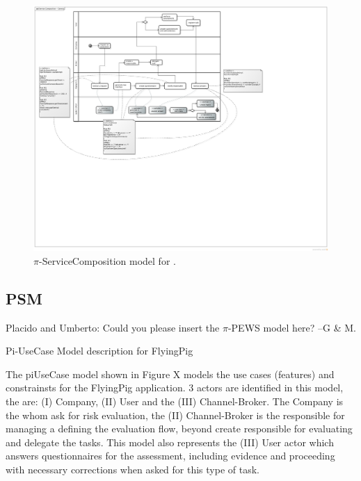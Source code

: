 \begin{figure}
\centering
\includegraphics[width=1.0\textwidth]{figs/ServiceCompositionGeneral.png}
\caption{$\pi$-ServiceComposition model for \FlyingPig.\label{fig:PiServiceCompositionModel}}
\end{figure}


\subsection{PSM}

{\color{magenta} Placido and Umberto: Could you please insert the $\pi$-PEWS model here? --G \& M.}



Pi-UseCase Model description for FlyingPig

The piUseCase model shown in Figure  X models the use cases (features) and constrainsts for the FlyingPig application. 3 actors are identified in this model, the are: (I) Company, (II) User and the (III) Channel-Broker. The Company is the whom ask for risk evaluation, the (II) Channel-Broker is the responsible for managing a defining the evaluation flow, beyond create responsible for evaluating and delegate the tasks. This model also represents the (III) User actor which answers questionnaires for the assessment, including evidence and proceeding with necessary corrections when asked for this type of task.

